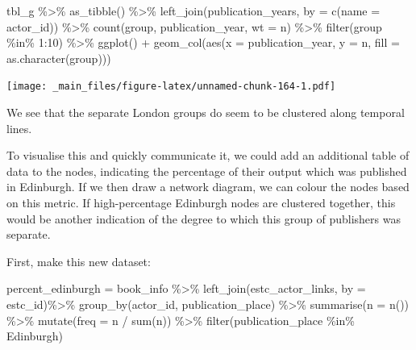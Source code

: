 \documentclass[
]{book}
\newenvironment{Shaded}{\begin{snugshade}}{\end{snugshade}}
\newcommand{\AttributeTok}[1]{\textcolor[rgb]{0.77,0.63,0.00}{#1}}
\newcommand{\DecValTok}[1]{\textcolor[rgb]{0.00,0.00,0.81}{#1}}
\newcommand{\FunctionTok}[1]{\textcolor[rgb]{0.00,0.00,0.00}{#1}}
\newcommand{\NormalTok}[1]{#1}
\newcommand{\OtherTok}[1]{\textcolor[rgb]{0.56,0.35,0.01}{#1}}
\newcommand{\SpecialCharTok}[1]{\textcolor[rgb]{0.00,0.00,0.00}{#1}}
\newcommand{\StringTok}[1]{\textcolor[rgb]{0.31,0.60,0.02}{#1}}
\begin{document}
\begin{Shaded}
\begin{Highlighting}[]
\NormalTok{ tbl\_g }\SpecialCharTok{\%\textgreater{}\%} 
  \FunctionTok{as\_tibble}\NormalTok{() }\SpecialCharTok{\%\textgreater{}\%} 
  \FunctionTok{left\_join}\NormalTok{(publication\_years, }\AttributeTok{by =} \FunctionTok{c}\NormalTok{(}\StringTok{\textquotesingle{}name\textquotesingle{}} \OtherTok{=} \StringTok{\textquotesingle{}actor\_id\textquotesingle{}}\NormalTok{)) }\SpecialCharTok{\%\textgreater{}\%} 
  \FunctionTok{count}\NormalTok{(group, publication\_year, }\AttributeTok{wt =}\NormalTok{ n) }\SpecialCharTok{\%\textgreater{}\%} 
   \FunctionTok{filter}\NormalTok{(group }\SpecialCharTok{\%in\%} \DecValTok{1}\SpecialCharTok{:}\DecValTok{10}\NormalTok{) }\SpecialCharTok{\%\textgreater{}\%} 
  \FunctionTok{ggplot}\NormalTok{() }\SpecialCharTok{+} \FunctionTok{geom\_col}\NormalTok{(}\FunctionTok{aes}\NormalTok{(}\AttributeTok{x =}\NormalTok{ publication\_year, }\AttributeTok{y =}\NormalTok{ n, }\AttributeTok{fill =} \FunctionTok{as.character}\NormalTok{(group)))}
\end{Highlighting}
\end{Shaded}

\texttt{[image: \_main\_files/figure-latex/unnamed-chunk-164-1.pdf]}

We see that the separate London groups do seem to be clustered along temporal lines.

To visualise this and quickly communicate it, we could add an additional table of data to the nodes, indicating the percentage of their output which was published in Edinburgh. If we then draw a network diagram, we can colour the nodes based on this metric. If high-percentage Edinburgh nodes are clustered together, this would be another indication of the degree to which this group of publishers was separate.

First, make this new dataset:

\begin{Shaded}
\begin{Highlighting}[]
\NormalTok{percent\_edinburgh }\OtherTok{=}\NormalTok{ book\_info }\SpecialCharTok{\%\textgreater{}\%} \FunctionTok{left\_join}\NormalTok{(estc\_actor\_links, }\AttributeTok{by =} \StringTok{\textquotesingle{}estc\_id\textquotesingle{}}\NormalTok{)}\SpecialCharTok{\%\textgreater{}\%}
  \FunctionTok{group\_by}\NormalTok{(actor\_id, publication\_place) }\SpecialCharTok{\%\textgreater{}\%}
  \FunctionTok{summarise}\NormalTok{(}\AttributeTok{n =} \FunctionTok{n}\NormalTok{()) }\SpecialCharTok{\%\textgreater{}\%}
  \FunctionTok{mutate}\NormalTok{(}\AttributeTok{freq =}\NormalTok{ n }\SpecialCharTok{/} \FunctionTok{sum}\NormalTok{(n)) }\SpecialCharTok{\%\textgreater{}\%} 
  \FunctionTok{filter}\NormalTok{(publication\_place }\SpecialCharTok{\%in\%}  \StringTok{\textquotesingle{}Edinburgh\textquotesingle{}}\NormalTok{)}
\end{Highlighting}
\end{Shaded}
\end{document}

